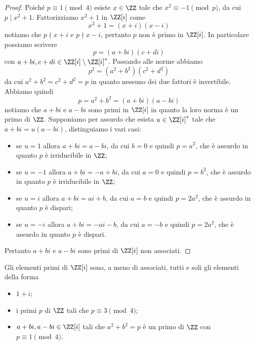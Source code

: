 \documentclass[11pt]{scrartcl}
\begin{document}
	\begin{proof}
		Poiché $p \equiv 1 \pmod 4$ esiste $x \in \ZZ$ tale che $x^2 \equiv -1 \pmod p$,
		da cui $p \mid x^2 + 1$. Fattorizziamo $x^2 + 1$ in $\ZZ[i]$ come 
		\[
		x^2 + 1 = (x + i)(x - i)
		\]
		notiamo che $p\nmid x + i$ e $p \nmid x - i$, pertanto $p$ non è primo in $\ZZ[i]$.
		In particolare possiamo scrivere 
		\[
		p = (a + bi)(c + di)
		\]
		con $a + bi, c + di \in \ZZ[i] \setminus \ZZ[i]^*$. Passando alle norme 
		abbiamo
		\[
		p^2 = (a^2 + b^2)(c^2 + d^2)
		\]
		da cui $a^2 + b^2 = c^2 + d^2 = p$ in quanto nessuno dei due fattori è 
		invertibile. Abbiamo quindi 
		\[
		p = a^2 + b^2 = (a + bi)(a - bi)
		\]
		notiamo che $a + bi$ e $a - bi$ sono primi in $\ZZ[i]$ in quanto la loro 
		norma è un primo di $\ZZ$. Supponiamo per assurdo che esista $u \in \ZZ[i]^*$
		tale che $a + bi = u(a - bi)$, distinguiamo i vari casi:
		\begin{itemize}
			\item se $u = 1$ allora $a + bi = a - bi$, da cui $b = 0$ e quindi $p = a^2$,
			che è assurdo in quanto $p$ è irriducibile in $\ZZ$;
			\item se $u = -1$ allora $a + bi = -a + bi$, da cui $a = 0$ e quindi
			$p = b^2$, che è assurdo in quanto $p$ è irriducibile in $\ZZ$;
			\item se $u = i$ allora $a + bi = ai + b$, da cui $a = b$ e quindi $p = 
			2a^2$, che è assurdo in quanto $p$ è dispari;
			\item se $u = -i$ allora $a + bi = -ai - b$, da cui $a = -b$ e quindi
			$p = 2a^2$, che è assurdo in quanto $p$ è dispari.
		\end{itemize}
		Pertanto $a + bi$ e $a - bi$ sono primi di $\ZZ[i]$ non associati.
	\end{proof}
	
	\begin{proposition}
		Gli elementi primi di $\ZZ[i]$ sono, a meno di associati, tutti e soli
		gli elementi della forma
		\begin{itemize}
			\item $1 + i$;
			\item i primi $p$ di $\ZZ$ tali che $p \equiv 3 \pmod 4$;
			\item $a + bi, a - bi \in \ZZ[i]$ tali che $a^2 + b^2 = p$ è un primo
			di $\ZZ$ con $p \equiv 1 \pmod 4$.
		\end{itemize}
	\end{proposition}
	
\end{document}
